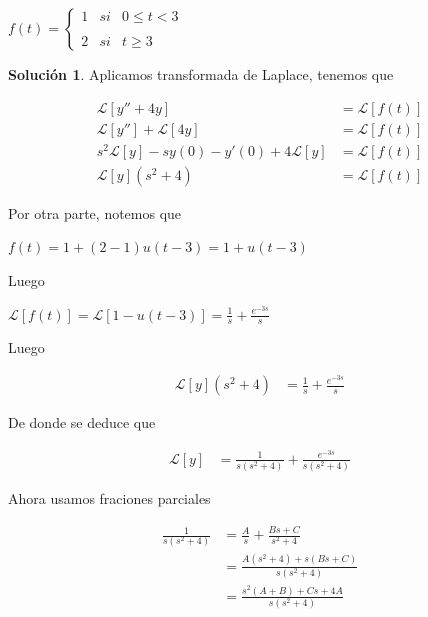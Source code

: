 \documentclass{article}
\theoremstyle{plain}
\theoremstyle{definition}
\newtheorem{sol}[thm]{Solución}
\begin{document}
\begin{center}
$f(t) = \left\{ \begin{array}{lcc} 1 & si & 0 \leq t < 3 \\ \\ 2 & si & t \geq 3  \end{array} \right.$
\end{center}

\begin{sol}Aplicamos transformada de Laplace, tenemos que
\end{sol}

\begin{align*}
\mathcal{L}[y''+4y] &=\mathcal{L}[f(t)] \\
\mathcal{L}[y'']+\mathcal{L}[4y] &=\mathcal{L}[f(t)]  \\
s^2\mathcal{L}[y]-sy(0)-y'(0)+4\mathcal{L}[y] &=\mathcal{L}[f(t)]\\
\mathcal{L}[y](s^2+4) &=\mathcal{L}[f(t)]
\end{align*}

Por otra parte, notemos que

\begin{center}
$f(t ) = 1+(2-1)u(t-3)=1+u(t-3)$
\end{center}

Luego


\begin{center}
$\displaystyle \mathcal{L} [f(t)] = \mathcal{L}[1-u(t-3)] = \frac{1}{s}+\frac{e^{-3s}}{s} $
\end{center}

Luego



\begin{align*}
\mathcal{L}[y](s^2+4) &=\frac{1}{s}+\frac{e^{-3s}}{s}
\end{align*}


De donde se deduce que

\begin{align*}
\mathcal{L}[y] &=\frac{1}{s(s^2+4)}+\frac{e^{-3s}}{s(s^2+4)}
\end{align*}

Ahora usamos fraciones parciales

\begin{align*}
\frac{1}{s(s^2+4)} &= \frac{A}{s}+\frac{Bs+C}{s^2+4} \\
&= \frac{A(s^2+4)+s(Bs+C)}{s(s^2+4)} \\
&= \frac{s^2(A+B)+Cs+4A}{s(s^2+4)} \\
\end{align*}
\end{document}
